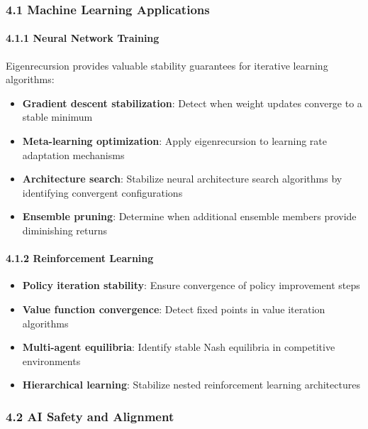 \documentclass[
]{article}
\providecommand{\tightlist}{%
  \setlength{\itemsep}{0pt}\setlength{\parskip}{0pt}}
\begin{document}
\subsubsection{4.1 Machine Learning
Applications}\label{machine-learning-applications}

\paragraph{4.1.1 Neural Network Training}\label{neural-network-training}

Eigenrecursion provides valuable stability guarantees for iterative
learning algorithms:

\begin{itemize}
\tightlist
\item
  \textbf{Gradient descent stabilization}: Detect when weight updates
  converge to a stable minimum
\item
  \textbf{Meta-learning optimization}: Apply eigenrecursion to learning
  rate adaptation mechanisms
\item
  \textbf{Architecture search}: Stabilize neural architecture search
  algorithms by identifying convergent configurations
\item
  \textbf{Ensemble pruning}: Determine when additional ensemble members
  provide diminishing returns
\end{itemize}

\paragraph{4.1.2 Reinforcement Learning}\label{reinforcement-learning}

\begin{itemize}
\tightlist
\item
  \textbf{Policy iteration stability}: Ensure convergence of policy
  improvement steps
\item
  \textbf{Value function convergence}: Detect fixed points in value
  iteration algorithms
\item
  \textbf{Multi-agent equilibria}: Identify stable Nash equilibria in
  competitive environments
\item
  \textbf{Hierarchical learning}: Stabilize nested reinforcement
  learning architectures
\end{itemize}

\subsubsection{4.2 AI Safety and
Alignment}\label{ai-safety-and-alignment}
\end{document}
